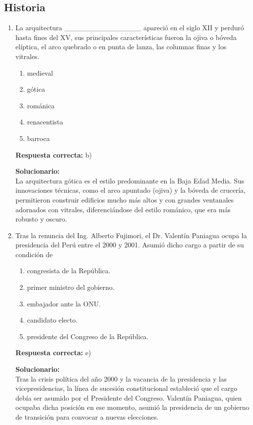 \subsection*{Historia}

\begin{enumerate}
	
\item La arquitectura \_\_\_\_\_\_\_\_\_\_\_\_\_\_\_ apareció en el siglo XII y perduró hasta fines del XV, sus principales características fueron la ojiva o bóveda elíptica, el arco quebrado o en punta de lanza, las columnas finas y los vitrales.

\begin{enumerate}[label=\alph*)]
	\item medieval
	\item gótica
	\item románica
	\item renacentista
	\item barroca
\end{enumerate}

\textbf{Respuesta correcta:} b)

\vspace{2mm}
\textbf{Solucionario:}\\
La arquitectura gótica es el estilo predominante en la Baja Edad Media. Sus innovaciones técnicas, como el arco apuntado (ojiva) y la bóveda de crucería, permitieron construir edificios mucho más altos y con grandes ventanales adornados con vitrales, diferenciándose del estilo románico, que era más robusto y oscuro.

\vspace{6mm}

\item Tras la renuncia del Ing. Alberto Fujimori, el Dr. Valentín Paniagua ocupa la presidencia del Perú entre el 2000 y 2001. Asumió dicho cargo a partir de su condición de

\begin{enumerate}[label=\alph*)]
	\item congresista de la República.
	\item primer ministro del gobierno.
	\item embajador ante la ONU.
	\item candidato electo.
	\item presidente del Congreso de la República.
\end{enumerate}

\textbf{Respuesta correcta:} e)

\vspace{2mm}
\textbf{Solucionario:}\\
Tras la crisis política del año 2000 y la vacancia de la presidencia y las vicepresidencias, la línea de sucesión constitucional estableció que el cargo debía ser asumido por el Presidente del Congreso. Valentín Paniagua, quien ocupaba dicha posición en ese momento, asumió la presidencia de un gobierno de transición para convocar a nuevas elecciones.

\vspace{6mm}	
	
\end{enumerate}




